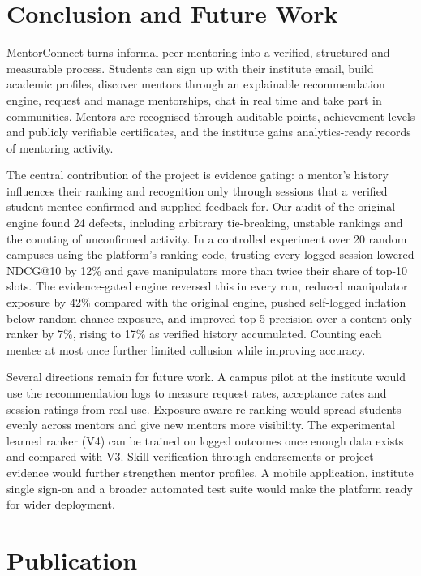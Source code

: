 \documentclass[12pt,a4paper]{report}
\begin{document}
\chapter{Conclusion and Future Work}
MentorConnect turns informal peer mentoring into a verified, structured and measurable process. Students can sign up with their institute email, build academic profiles, discover mentors through an explainable recommendation engine, request and manage mentorships, chat in real time and take part in communities. Mentors are recognised through auditable points, achievement levels and publicly verifiable certificates, and the institute gains analytics-ready records of mentoring activity.

The central contribution of the project is evidence gating: a mentor's history influences their ranking and recognition only through sessions that a verified student mentee confirmed and supplied feedback for. Our audit of the original engine found 24 defects, including arbitrary tie-breaking, unstable rankings and the counting of unconfirmed activity. In a controlled experiment over 20 random campuses using the platform's ranking code, trusting every logged session lowered NDCG@10 by 12\% and gave manipulators more than twice their share of top-10 slots. The evidence-gated engine reversed this in every run, reduced manipulator exposure by 42\% compared with the original engine, pushed self-logged inflation below random-chance exposure, and improved top-5 precision over a content-only ranker by 7\%, rising to 17\% as verified history accumulated. Counting each mentee at most once further limited collusion while improving accuracy.

Several directions remain for future work. A campus pilot at the institute would use the recommendation logs to measure request rates, acceptance rates and session ratings from real use. Exposure-aware re-ranking would spread students evenly across mentors and give new mentors more visibility. The experimental learned ranker (V4) can be trained on logged outcomes once enough data exists and compared with V3. Skill verification through endorsements or project evidence would further strengthen mentor profiles. A mobile application, institute single sign-on and a broader automated test suite would make the platform ready for wider deployment.

\chapter{Publication}
\end{document}
